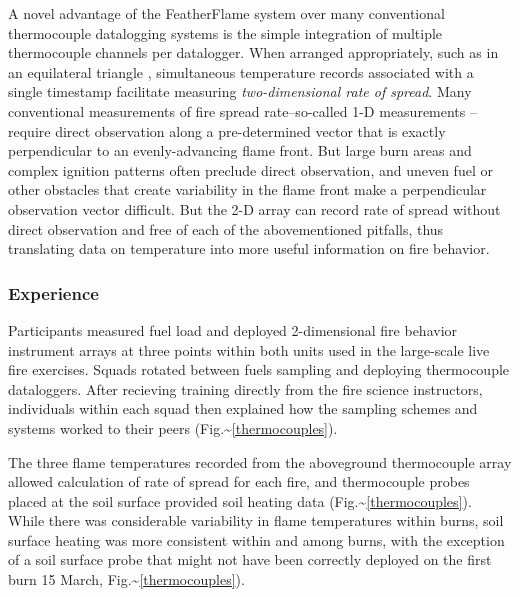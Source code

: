 \documentclass[fire,article,submit,moreauthors,pdftex]{Definitions/mdpi}
\begin{document}
A novel advantage of the FeatherFlame system over many conventional thermocouple datalogging systems is the simple integration of multiple thermocouple channels per datalogger.
When arranged appropriately, such as in an equilateral triangle \citep{simard1984}, simultaneous temperature records associated with a single timestamp facilitate measuring \emph{two-dimensional rate of spread}.
Many conventional measurements of fire spread rate--so-called 1-D measurements \citep{finney2021}--require direct observation along a pre-determined vector that is exactly perpendicular to an evenly-advancing flame front.
But large burn areas and complex ignition patterns often preclude direct observation, and uneven fuel or other obstacles that create variability in the flame front make a perpendicular observation vector difficult.
But the 2-D array can record rate of spread without direct observation and free of each of the abovementioned pitfalls, thus translating data on temperature into more useful information on fire behavior.

\hypertarget{experience-1}{%
\subsubsection{Experience}\label{experience-1}}

Participants measured fuel load and deployed 2-dimensional fire behavior instrument arrays at three points within both units used in the large-scale live fire exercises.
Squads rotated between fuels sampling and deploying thermocouple dataloggers.
After recieving training directly from the fire science instructors, individuals within each squad then explained how the sampling schemes and systems worked to their peers (Fig.\textasciitilde{}\ref{thermocouples}).

The three flame temperatures recorded from the aboveground thermocouple array allowed calculation of rate of spread for each fire, and thermocouple probes placed at the soil surface provided soil heating data (Fig.\textasciitilde{}\ref{thermocouples}).
While there was considerable variability in flame temperatures within burns, soil surface heating was more consistent within and among burns, with the exception of a soil surface probe that might not have been correctly deployed on the first burn 15 March, Fig.\textasciitilde{}\ref{thermocouples}).
\end{document}
